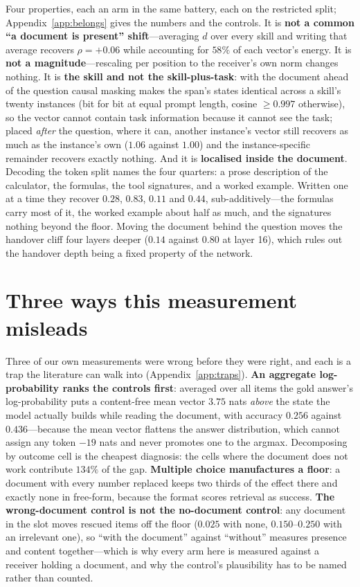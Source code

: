 \documentclass{article}
\newcommand{\dvec}{\ensuremath{d}}
\begin{document}
Four properties, each an arm in the same battery, each on the restricted split;
Appendix~\ref{app:belongs} gives the numbers and the controls. It is
\textbf{not a common ``a document is present'' shift}---averaging $\dvec$ over
every skill and writing that average recovers $\rho=+0.06$ while accounting for
$58\%$ of each vector's energy. It is \textbf{not a magnitude}---rescaling per
position to the receiver's own norm changes nothing. It is \textbf{the skill and
not the skill-plus-task}: with the document ahead of the question causal masking
makes the span's states identical across a skill's twenty instances (bit for bit
at equal prompt length, cosine $\ge 0.997$ otherwise), so the vector cannot contain task
information because it cannot see the task; placed \emph{after} the question,
where it can, another instance's vector still recovers as much as the instance's
own ($1.06$ against $1.00$) and the instance-specific remainder recovers exactly
nothing. And it is \textbf{localised inside the document}. Decoding the token split
names the four quarters: a prose description of the calculator, the formulas,
the tool signatures, and a worked example. Written one at a time they recover
$0.28$, $\mathbf{0.83}$, $0.11$ and $0.44$, sub-additively---the formulas carry
most of it, the worked example about half as much, and the signatures nothing
beyond the floor. Moving the document behind the question moves the handover cliff four
layers deeper ($0.14$ against $0.80$ at layer 16), which rules out the handover
depth being a fixed property of the network.

\section{Three ways this measurement misleads}
\label{sec:traps}

Three of our own measurements were wrong before they were right, and each is a
trap the literature can walk into (Appendix~\ref{app:traps}).
\textbf{An aggregate log-probability ranks the controls first}: averaged over
all items the gold answer's log-probability puts a content-free mean vector
$3.75$ nats \emph{above} the state the model actually builds while reading the
document, with accuracy $0.256$ against $0.436$---because the mean vector
flattens the answer distribution, which cannot assign any token $-19$ nats and
never promotes one to the argmax. Decomposing by outcome cell is the cheapest
diagnosis: the cells where the document does not work contribute $134\%$ of the
gap. \textbf{Multiple choice manufactures a floor}: a document with every number
replaced keeps two thirds of the effect there and exactly none in free-form,
because the format scores retrieval as success. \textbf{The wrong-document
control is not the no-document control}: any document in the slot moves rescued
items off the floor ($0.025$ with none, $0.150$--$0.250$ with an irrelevant
one), so ``with the document'' against ``without'' measures presence and content
together---which is why every arm here is measured against a receiver holding a
document, and why the control's plausibility has to be named rather than
counted.
\end{document}
